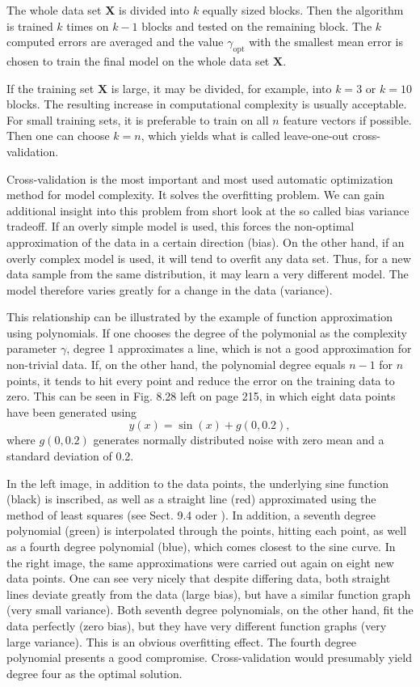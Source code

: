 \documentclass[10pt]{book}
\begin{document}
The whole data set $\boldsymbol{X}$ is divided into $k$ equally sized blocks. Then the algorithm is trained $k$ times on $k-1$ blocks and tested on the remaining block. The $k$ computed errors are averaged and the value $\gamma_{\text{opt}}$ with the smallest mean error is chosen to train the final model on the whole data set $\boldsymbol{X}$.

If the training set $\boldsymbol{X}$ is large, it may be divided, for example, into $k=3$ or $k=10$ blocks. The resulting increase in computational complexity is usually acceptable. For small training sets, it is preferable to train on all $n$ feature vectors if possible. Then one can choose $k=n$, which yields what is called leave-one-out cross-validation.

Cross-validation is the most important and most used automatic optimization method for model complexity. It solves the overfitting problem. We can gain additional insight into this problem from short look at the so called bias variance tradeoff. If an overly simple model is used, this forces the non-optimal approximation of the data in a certain direction (bias). On the other hand, if an overly complex model is used, it will tend to overfit any data set. Thus, for a new data sample from the same distribution, it may learn a very different model. The model therefore varies greatly for a change in the data (variance).

This relationship can be illustrated by the example of function approximation using polynomials. If one chooses the degree of the polymonial as the complexity parameter $\gamma$, degree 1 approximates a line, which is not a good approximation for non-trivial data. If, on the other hand, the polynomial degree equals $n-1$ for $n$ points, it tends to hit every point and reduce the error on the training data to zero. This can be seen in Fig. 8.28 left on page 215, in which eight data points have been generated using
\[
y(x)=\sin (x)+g(0,0.2),
\]
where $g(0,0.2)$ generates normally distributed noise with zero mean and a standard deviation of 0.2.

In the left image, in addition to the data points, the underlying sine function (black) is inscribed, as well as a straight line (red) approximated using the method of least squares (see Sect. 9.4 oder \cite{ertel2015matheng}). In addition, a seventh degree polynomial (green) is interpolated through the points, hitting each point, as well as a fourth degree polynomial (blue), which comes closest to the sine curve. In the right image, the same approximations were carried out again on eight new data points. One can see very nicely that despite differing data, both straight lines deviate greatly from the data (large bias), but have a similar function graph (very small variance). Both seventh degree polynomials, on the other hand, fit the data perfectly (zero bias), but they have very different function graphs (very large variance). This is an obvious overfitting effect. The fourth degree polynomial presents a good compromise. Cross-validation would presumably yield degree four as the optimal solution.
\end{document}
